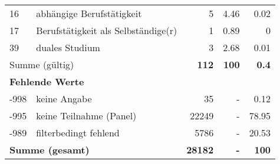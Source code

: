 \begin{longtable}{lXrrr}
     16 &
     \multicolumn{1}{X}{ abhängige Berufstätigkeit   } &


       \num{5} &
       \num[round-mode=places,round-precision=2]{4,46} &
         \num[round-mode=places,round-precision=2]{0,02} \\

     17 &
     \multicolumn{1}{X}{ Berufstätigkeit als Selbständige(r)   } &


       \num{1} &
       \num[round-mode=places,round-precision=2]{0,89} &
         \num[round-mode=places,round-precision=2]{0} \\

     39 &
     \multicolumn{1}{X}{ duales Studium   } &


       \num{3} &
       \num[round-mode=places,round-precision=2]{2,68} &
         \num[round-mode=places,round-precision=2]{0,01} \\
     \midrule
     \multicolumn{2}{l}{Summe (gültig)} &
       \textbf{\num{112}} &
     \textbf{100} &
       \textbf{\num[round-mode=places,round-precision=2]{0,4}} \\
     \multicolumn{5}{l}{\textbf{Fehlende Werte}}\\
       -998 &
       keine Angabe &
         \num{35} &
        - &
         \num[round-mode=places,round-precision=2]{0,12} \\
       -995 &
       keine Teilnahme (Panel) &
         \num{22249} &
        - &
         \num[round-mode=places,round-precision=2]{78,95} \\
       -989 &
       filterbedingt fehlend &
         \num{5786} &
        - &
         \num[round-mode=places,round-precision=2]{20,53} \\
     \midrule
     \multicolumn{2}{l}{\textbf{Summe (gesamt)}} &
          \textbf{\num{28182}} &
        \textbf{-} &
        \textbf{100} \\
     \bottomrule
     \end{longtable}
     
